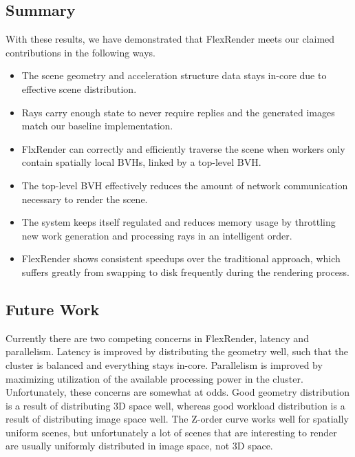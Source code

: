 \documentclass[a4paper,twoside]{article}
\begin{document}
\subsection{Summary}
\label{resultssummary}

With these results, we have demonstrated that FlexRender meets our claimed
contributions in the following ways.

\begin{itemize}
    \item The scene geometry and acceleration structure data stays in-core due
        to effective scene distribution.
    \item Rays carry enough state to never require replies and the generated
        images match our baseline implementation.
    \item FlxRender can correctly and efficiently traverse the scene when workers
        only contain spatially local BVHs, linked by a top-level BVH.
    \item The top-level BVH effectively reduces the amount of network
        communication necessary to render the scene.
    \item The system keeps itself regulated and reduces memory usage by
        throttling new work generation and processing rays in an intelligent
        order.
    \item FlexRender shows consistent speedups over the traditional approach, which
        suffers greatly from swapping to disk frequently during the rendering
        process.
\end{itemize}

\subsection{Future Work}
\label{futurework}

Currently there are two competing concerns in FlexRender, latency and
parallelism. Latency is improved by distributing the geometry well, such that
the cluster is balanced and everything stays in-core. Parallelism is improved
by maximizing utilization of the available processing power in the cluster.
Unfortunately, these concerns are somewhat at odds. Good geometry distribution
is a result of distributing 3D space well, whereas good workload distribution
is a result of distributing image space well. The Z-order curve works well
for spatially uniform scenes, but unfortunately a lot of scenes that are
interesting to render are usually uniformly distributed in image space, not
3D space. 
\end{document}
